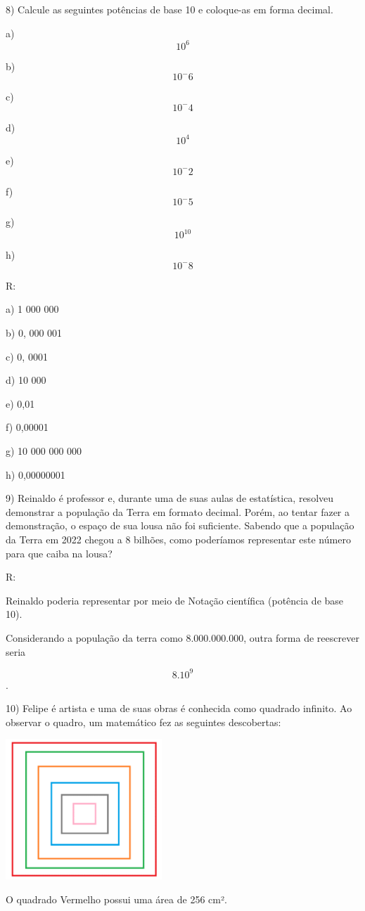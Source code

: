 8) Calcule as seguintes potências de base 10 e coloque-as em forma
decimal.

a) \[10^6\]

b) \[10^-6\]

c) \[10^-4\]

d) \[10^4\]

e) \[10^-2\]

f) \[10 ^-5\]

g) \[10^10\]

h) \[10^-8\]

R:

a) 1 000 000

b) 0, 000 001

c) 0, 0001

d) 10 000

e) 0,01

f) 0,00001

g) 10 000 000 000

h) 0,00000001

9) Reinaldo é professor e, durante uma de suas aulas de estatística,
resolveu demonstrar a população da Terra em formato decimal. Porém, ao
tentar fazer a demonstração, o espaço de sua lousa não foi suficiente.
Sabendo que a população da Terra em 2022 chegou a 8 bilhões, como
poderíamos representar este número para que caiba na lousa?

R:

Reinaldo poderia representar por meio de Notação científica (potência de
base 10).

Considerando a população da terra como 8.000.000.000, outra forma de
reescrever seria

\[8 . 10^9\].

10) Felipe é artista e uma de suas obras é conhecida como quadrado
infinito. Ao observar o quadro, um matemático fez as seguintes
descobertas:

\includegraphics[width=2.3125in,height=2.07917in]{./imgSAEB_8_MAT/media/image2.png}

O quadrado Vermelho possui uma área de 256 cm².

